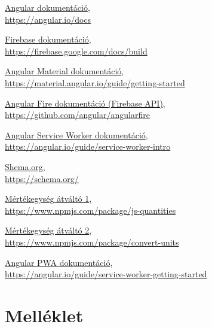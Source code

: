 \documentclass[12pt]{report}
\theoremstyle{definition}
\begin{document}
\begin{thebibliography}{9}







	\href{https://angular.io/docs}{Angular dokumentáció}, \\
	\url{https://angular.io/docs}

	\href{https://firebase.google.com/docs/build}{Firebase dokumentáció}, \\
	\url{https://firebase.google.com/docs/build}
	
	\href{https://material.angular.io/guide/getting-started}{Angular Material dokumentáció}, \\
	\url{https://material.angular.io/guide/getting-started}  

	\href{https://github.com/angular/angularfire}
	{Angular Fire dokumentáció (Firebase API)},\\
	\url{https://github.com/angular/angularfire}

	\href{https://angular.io/guide/service-worker-intro}{Angular Service Worker dokumentáció}, \\
	\url{https://angular.io/guide/service-worker-intro}

	\href{https://schema.org/}{Shema.org}, \\
	\url{https://schema.org/}

	\href{https://www.npmjs.com/package/js-quantities}{Mértékegység átváltó 1}, \\
	\url{https://www.npmjs.com/package/js-quantities}

	\href{https://www.npmjs.com/package/convert-units}{Mértékegység átváltó 2}, \\
	\url{https://www.npmjs.com/package/convert-units}

	\href{https://angular.io/guide/service-worker-getting-started}{Angular PWA dokumentáció}, \\
	\url{https://angular.io/guide/service-worker-getting-started}

\end{thebibliography}

\chapter{Melléklet}

\printglossary[title=Szótár]
\end{document}
